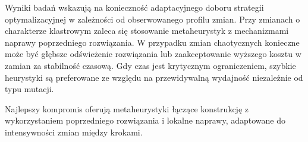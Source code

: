 Wyniki badań wskazują na konieczność adaptacyjnego doboru strategii optymalizacyjnej w zależności od obserwowanego profilu zmian. Przy zmianach o charakterze klastrowym zaleca się stosowanie metaheurystyk z mechanizmami naprawy poprzedniego rozwiązania. W przypadku zmian chaotycznych konieczne może być głębsze odświeżenie rozwiązania lub zaakceptowanie wyższego kosztu w zamian za stabilność czasową. Gdy czas jest krytycznym ograniczeniem, szybkie heurystyki są preferowane ze względu na przewidywalną wydajność niezależnie od typu mutacji.

Najlepszy kompromis oferują metaheurystyki łączące konstrukcję z wykorzystaniem poprzedniego rozwiązania i lokalne naprawy, adaptowane do intensywności zmian między krokami.
